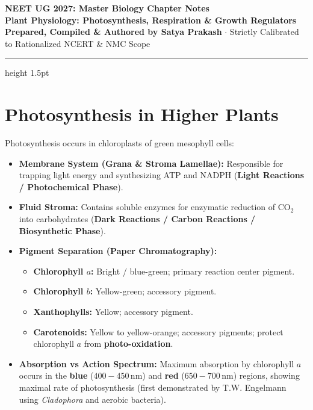 \documentclass[10pt,a4paper]{article}
\begin{document}
\begin{center}
  {\Huge \textbf{NEET UG 2027: Master Biology Chapter Notes}}\\[6pt]
  {\Large \textbf{Plant Physiology: Photosynthesis, Respiration \& Growth Regulators}}\\[4pt]
  {\small \textbf{Prepared, Compiled \& Authored by Satya Prakash} $\cdot$ Strictly Calibrated to Rationalized NCERT \& NMC Scope}
  \vspace{4pt}
  \hrule height 1.5pt
\end{center}

\pagestyle{fancy}
\fancyhf{}
\fancyfoot[C]{\thepage}

\section{Photosynthesis in Higher Plants}

\begin{conceptbox}
Photosynthesis occurs in chloroplasts of green mesophyll cells:
\begin{itemize}
  \item \textbf{Membrane System (Grana \& Stroma Lamellae):} Responsible for trapping light energy and synthesizing ATP and NADPH (\textbf{Light Reactions / Photochemical Phase}).
  \item \textbf{Fluid Stroma:} Contains soluble enzymes for enzymatic reduction of $\mathrm{CO}_2$ into carbohydrates (\textbf{Dark Reactions / Carbon Reactions / Biosynthetic Phase}).
  \item \textbf{Pigment Separation (Paper Chromatography):}
  \begin{itemize}
    \item \textbf{Chlorophyll $a$:} Bright / blue-green; primary reaction center pigment.
    \item \textbf{Chlorophyll $b$:} Yellow-green; accessory pigment.
    \item \textbf{Xanthophylls:} Yellow; accessory pigment.
    \item \textbf{Carotenoids:} Yellow to yellow-orange; accessory pigments; protect chlorophyll $a$ from \textbf{photo-oxidation}.
  \end{itemize}
  \item \textbf{Absorption vs Action Spectrum:} Maximum absorption by chlorophyll $a$ occurs in the \textbf{blue} ($400-450\,\mathrm{nm}$) and \textbf{red} ($650-700\,\mathrm{nm}$) regions, showing maximal rate of photosynthesis (first demonstrated by T.W. Engelmann using \textit{Cladophora} and aerobic bacteria).
\end{itemize}
\end{conceptbox}
\end{document}
